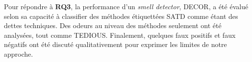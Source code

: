 Pour r\'{e}pondre \`{a} \textbf{RQ3}, la performance d'un \emph{smell detector}, \ac{DECOR}, a \'{e}t\'{e} \'{e}valu\'{e} selon sa capacit\'{e} \`{a} classifier des m\'{e}thodes \'{e}tiquett\'{e}es \ac{SATD} comme \'{e}tant des dettes techniques. Des odeurs au niveau des m\'{e}thodes seulement ont \'{e}t\'{e} analys\'{e}es, tout comme \ac{TEDIOUS}. Finalement, quelques faux positifs et faux n\'{e}gatifs ont \'{e}t\'{e} discut\'{e} qualitativement pour exprimer les limites de notre approche. \par

























